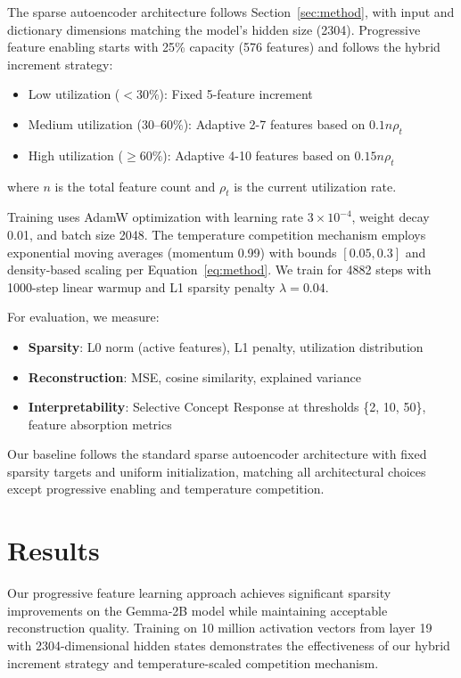 \documentclass{article} %
\begin{document}
The sparse autoencoder architecture follows Section~\ref{sec:method}, with input and dictionary dimensions matching the model's hidden size (2304). Progressive feature enabling starts with 25\% capacity (576 features) and follows the hybrid increment strategy:

\begin{itemize}
    \item Low utilization ($<30\%$): Fixed 5-feature increment
    \item Medium utilization ($30\text{--}60\%$): Adaptive 2-7 features based on $0.1n\rho_t$
    \item High utilization ($\geq60\%$): Adaptive 4-10 features based on $0.15n\rho_t$
\end{itemize}

\noindent where $n$ is the total feature count and $\rho_t$ is the current utilization rate.

Training uses AdamW optimization with learning rate $3\times10^{-4}$, weight decay 0.01, and batch size 2048. The temperature competition mechanism employs exponential moving averages (momentum 0.99) with bounds $[0.05, 0.3]$ and density-based scaling per Equation~\ref{eq:method}. We train for 4882 steps with 1000-step linear warmup and L1 sparsity penalty $\lambda=0.04$.

For evaluation, we measure:
\begin{itemize}
    \item \textbf{Sparsity}: L0 norm (active features), L1 penalty, utilization distribution
    \item \textbf{Reconstruction}: MSE, cosine similarity, explained variance
    \item \textbf{Interpretability}: Selective Concept Response at thresholds \{2, 10, 50\}, feature absorption metrics
\end{itemize}

Our baseline follows the standard sparse autoencoder architecture with fixed sparsity targets and uniform initialization, matching all architectural choices except progressive enabling and temperature competition.

\section{Results}
\label{sec:results}

Our progressive feature learning approach achieves significant sparsity improvements on the Gemma-2B model while maintaining acceptable reconstruction quality. Training on 10 million activation vectors from layer 19 with 2304-dimensional hidden states demonstrates the effectiveness of our hybrid increment strategy and temperature-scaled competition mechanism.
\end{document}
